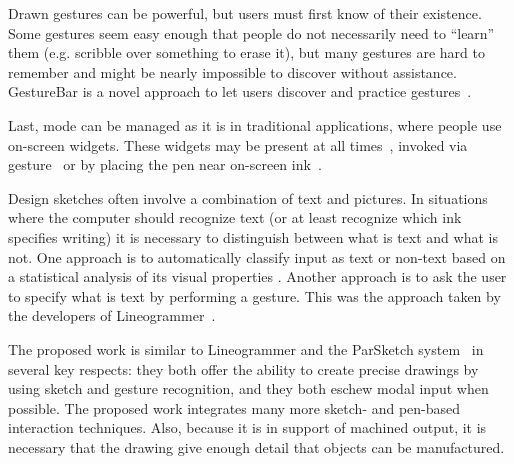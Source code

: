 \documentclass[11pt]{article}
\begin{document}
Drawn gestures can be powerful, but users must first know of their
existence. Some gestures seem easy enough that people do not
necessarily need to ``learn'' them (e.g. scribble over something to
erase it), but many gestures are hard to remember and might be nearly
impossible to discover without assistance. GestureBar is a novel
approach to let users discover and practice
gestures~\cite{bragdon-gesturebar}.

Last, mode can be managed as it is in traditional applications, where
people use on-screen widgets. These widgets may be present at all
times~\cite{forbus-nusketch-battlespace}, invoked via
gesture~\cite{grossman-hover-widgets,kurtenbach-marking-menus} or by
placing the pen near on-screen
ink~\cite{marinkas-shadowbutton,grossman-handle-flag}.

Design sketches often involve a combination of text and pictures. In
situations where the computer should recognize text (or at least
recognize which ink specifies writing) it is necessary to distinguish
between what is text and what is not. One approach is to automatically
classify input as text or non-text based on a statistical analysis of
its visual properties \cite{patel-detect-text}. Another approach is to
ask the user to specify what is text by performing a gesture. This was
the approach taken by the developers of
Lineogrammer~\cite{zeleznik-lineogrammer}.

The proposed work is similar to Lineogrammer and the ParSketch
system~\cite{company-sketching-in-engineering,naya-parsketch} in
several key respects: they both offer the ability to create precise
drawings by using sketch and gesture recognition, and they both eschew
modal input when possible. The proposed work integrates many more
sketch- and pen-based interaction techniques. Also, because it is in
support of machined output, it is necessary that the drawing give
enough detail that objects can be manufactured.
\end{document}

